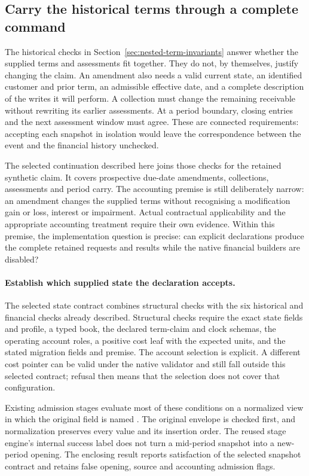 \subsection{Carry the historical terms through a complete command}
\label{sec:selected-term-execution}

The historical checks in Section~\ref{sec:nested-term-invariants} answer whether
the supplied terms and assessments fit together. They do not, by themselves,
justify changing the claim. An amendment also needs a valid current state,
an identified customer and prior term, an admissible effective date, and a
complete description of the writes it will perform. A collection must change
the remaining receivable without rewriting its earlier assessments. At a
period boundary, closing entries and the next assessment window must agree.
These are connected requirements: accepting each snapshot in isolation would
leave the correspondence between the event and the financial history unchecked.

The selected continuation described here joins those checks for the retained
synthetic claim. It covers prospective due-date amendments, collections,
assessments and period carry. The accounting premise is still deliberately
narrow: an amendment changes the supplied terms without recognising a
modification gain or loss, interest or impairment. Actual contractual
applicability and the appropriate accounting treatment require their own
evidence. Within this premise, the implementation question is precise: can
explicit declarations produce the complete retained requests and results while
the native financial builders are disabled?

\paragraph{Establish which supplied state the declaration accepts.}
The selected state contract combines structural checks with the six historical
and financial checks already described. Structural checks require the exact
state fields and profile, a typed book, the declared term-claim and clock
schemas, the operating account roles, a positive cost leaf with the expected
units, and the stated migration fields and premise. The account selection is
explicit. A different cost pointer can be valid under the native validator
and still fall outside this selected contract; refusal then means that the
selection does not cover that configuration.

Existing admission stages evaluate most of these conditions on a normalized
view in which the original  field is named . The
original envelope is checked first, and normalization preserves every value
and its insertion order. The reused stage engine's internal success label does
not turn a mid-period snapshot into a new-period opening. The enclosing result
reports satisfaction of the selected snapshot contract and retains false
opening, source and accounting admission flags.

